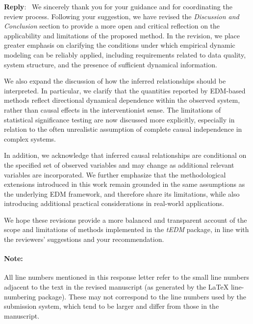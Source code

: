 \documentclass[11pt]{article}
\newcounter{reviewer}
\newenvironment{reply}
   {\medskip \noindent \color{blue} \begin{sf}\textbf{Reply}:\  }
   {\medskip \par \end{sf}}
\begin{document}
\begin{reply}
We sincerely thank you for your guidance and for coordinating the review process. Following your suggestion, we have revised the \textit{Discussion and Conclusion} section to provide a more open and critical reflection on the applicability and limitations of the proposed method. In the revision, we place greater emphasis on clarifying the conditions under which empirical dynamic modeling can be reliably applied, including requirements related to data quality, system structure, and the presence of sufficient dynamical information.

We also expand the discussion of how the inferred relationships should be interpreted. In particular, we clarify that the quantities reported by EDM-based methods reflect directional dynamical dependence within the observed system, rather than causal effects in the interventionist sense. The limitations of statistical significance testing are now discussed more explicitly, especially in relation to the often unrealistic assumption of complete causal independence in complex systems.

In addition, we acknowledge that inferred causal relationships are conditional on the specified set of observed variables and may change as additional relevant variables are incorporated. We further emphasize that the methodological extensions introduced in this work remain grounded in the same assumptions as the underlying EDM framework, and therefore share its limitations, while also introducing additional practical considerations in real-world applications.

We hope these revisions provide a more balanced and transparent account of the scope and limitations of methods implemented in the \textit{tEDM} package, in line with the reviewers' suggestions and your recommendation.
\end{reply}

\paragraph{Note:} All line numbers mentioned in this response letter refer to the small line numbers adjacent to the text in the revised manuscript (as generated by the \LaTeX{} line-numbering package). These may not correspond to the line numbers used by the submission system, which tend to be larger and differ from those in the manuscript.
\end{document}
